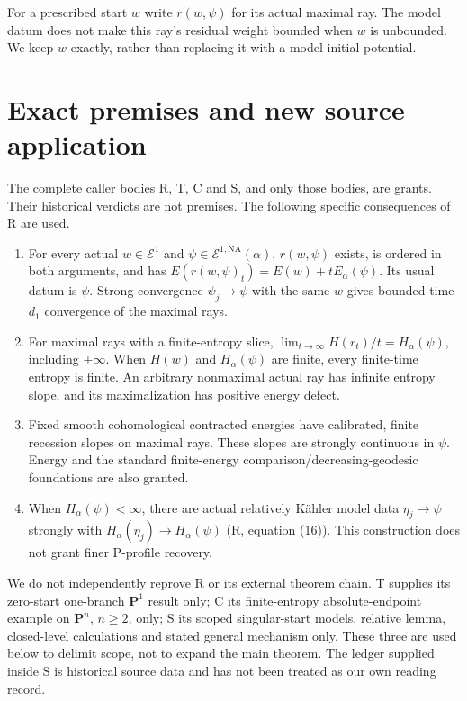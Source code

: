 \documentclass[11pt]{article}
\newcommand{\NA}{\mathrm{NA}}
\begin{document}
For a prescribed start $w$ write $r(w,\psi)$ for its actual maximal
ray. The model datum does not make this ray's residual weight bounded
when $w$ is unbounded. We keep $w$ exactly, rather than replacing it
with a model initial potential.

\section{Exact premises and new source application}
The complete caller bodies R, T, C and S, and only those bodies, are
grants. Their historical verdicts are not premises. The following
specific consequences of R are used.
\begin{enumerate}
\item For every actual $w\in\mathcal E^1$ and
$\psi\in\mathcal E^{1,\NA}(\alpha)$, $r(w,\psi)$ exists, is ordered
in both arguments, and has
$E(r(w,\psi)_t)=E(w)+tE_\alpha(\psi)$. Its usual datum is $\psi$.
Strong convergence $\psi_j\to\psi$ with the same $w$ gives bounded-time
$d_1$ convergence of the maximal rays.
\item For maximal rays with a finite-entropy slice,
$\lim_{t\to\infty}H(r_t)/t=H_\alpha(\psi)$, including $+\infty$.
When $H(w)$ and $H_\alpha(\psi)$ are finite, every finite-time
entropy is finite. An arbitrary nonmaximal actual ray has infinite
entropy slope, and its maximalization has positive energy defect.
\item Fixed smooth cohomological contracted energies have calibrated,
finite recession slopes on maximal rays. These slopes are strongly
continuous in $\psi$. Energy and the standard finite-energy
comparison/decreasing-geodesic foundations are also granted.
\item When $H_\alpha(\psi)<\infty$, there are actual relatively
K\"ahler model data $\eta_j\to\psi$ strongly with
$H_\alpha(\eta_j)\to H_\alpha(\psi)$ (R, equation (16)).
This construction does not grant finer P-profile recovery.
\end{enumerate}
We do not independently reprove R or its external theorem chain.
T supplies its zero-start one-branch $\mathbf P^1$ result only;
C its finite-entropy absolute-endpoint example on $\mathbf P^n$,
$n\ge2$, only; S its scoped singular-start models, relative lemma,
closed-level calculations and stated general mechanism only. These
three are used below to delimit scope, not to expand the main theorem.
The ledger supplied inside S is historical source data and has not
been treated as our own reading record.
\end{document}
